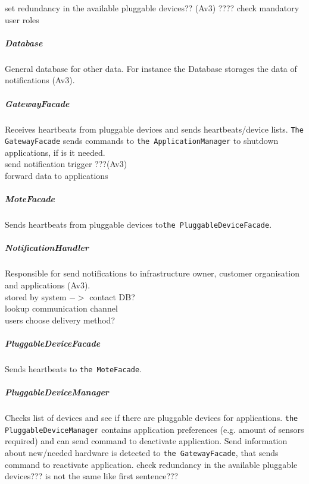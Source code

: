         set redundancy in the available pluggable devices??
        (Av3) ???? check mandatory user roles

    \subparagraph{Database}
        General database for other data. For instance the Database storages the data 
        of notifications (Av3).

    \subparagraph{GatewayFacade}
        Receives heartbeats from pluggable devices and sends heartbeats/device lists.
        \texttt{The GatewayFacade} sends commands to \texttt{the ApplicationManager}
        to shutdown applications, if is it needed. \\
        
        send notification trigger ???(Av3)\\
        forward data to applications

    \subparagraph{MoteFacade}
        Sends heartbeats from pluggable devices to\texttt{the PluggableDeviceFacade}.

    \subparagraph{NotificationHandler}
        Responsible for send notifications to infrastructure owner, customer organisation
        and applications (Av3). \\
        stored by system \(->\) contact DB? \\
        lookup communication channel \\
        users choose delivery method?

    \subparagraph{PluggableDeviceFacade}
        Sends heartbeats to \texttt{the MoteFacade}. 

    \subparagraph{PluggableDeviceManager}
        Checks list of devices and see if there are pluggable devices for applications.
        \texttt{the PluggableDeviceManager} contains application preferences (e.g. amount of sensors required) and 
        can send command to deactivate application.
        Send information about new/needed hardware is detected to \texttt{the GatewayFacade}, that sends command to
        reactivate application.
        check redundancy in the available pluggable devices??? is not the same like first sentence???


